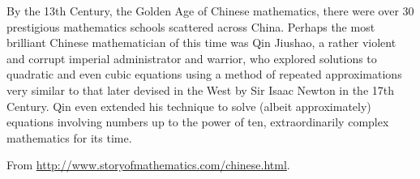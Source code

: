 By the 13th Century, the Golden Age of Chinese mathematics, there were over 30 prestigious mathematics schools scattered across China. Perhaps the most brilliant Chinese mathematician of this time was Qin Jiushao, a rather violent and corrupt imperial administrator and warrior, who explored solutions to quadratic and even cubic equations using a method of repeated approximations very similar to that later devised in the West by Sir Isaac Newton in the 17th Century. Qin even extended his technique to solve (albeit approximately) equations involving numbers up to the power of ten, extraordinarily complex mathematics for its time.

\begin{flushright}
  From \url{http://www.storyofmathematics.com/chinese.html}.
\end{flushright}

\clearpage
